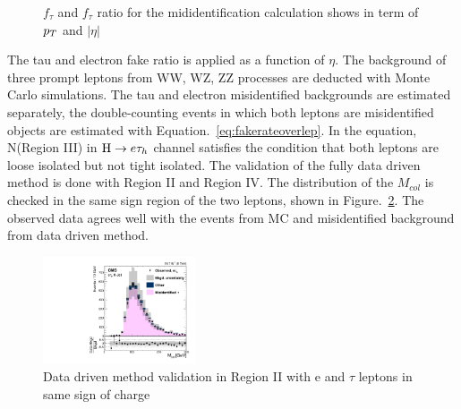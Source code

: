 \begin{figure}[htbp]
     \caption{$f_{\tau}$ and  $f_{\tau}$ ratio for the mididentification calculation shows in term of  $p_{T}$ and $|\eta|$}
     \label{fig:fakerationumberetau}
\end{figure}


The tau and electron fake ratio is applied as a function of $\eta$. The background of three prompt leptons from WW, WZ, ZZ processes  are deducted with Monte Carlo simulations. The tau and electron misidentified backgrounds are estimated separately, the double-counting events in which both leptons are misidentified objects are estimated with Equation.~\ref{eq:fakerateoverlep}. In the equation, N(Region III) in $\mathrm{H} \to e \tau_{h}$ channel satisfies the condition that both leptons are loose isolated but not tight isolated.  The validation of the fully data driven method is done with Region II and Region IV. The distribution of the $M_{col}$ is checked in the same sign region of the two leptons, shown in Figure.~\ref{fig:etaufakebackgroundValidationSS}. The observed data agrees well with the events from MC and misidentified background from data driven method.


\begin{figure}[!tbp] 
\centering
\includegraphics[width=0.4\textwidth]{chapter6/etausamesign.pdf}
\caption{Data driven method validation in Region II with e and $\tau$ leptons in same sign of charge}
\label{fig:etaufakebackgroundValidationSS}
\end{figure}


